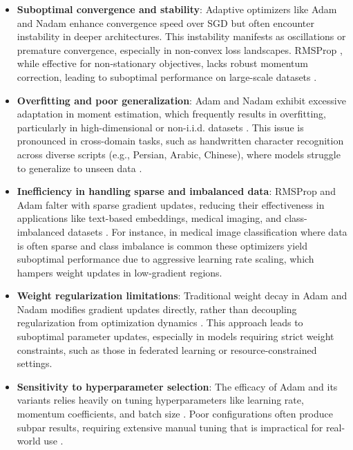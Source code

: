 \documentclass{article}
\begin{document}
\begin{itemize}
\item \textbf{Suboptimal convergence and stability}: Adaptive optimizers like Adam \cite{kingma2014adam} and Nadam \cite{Dozat2016} enhance convergence speed over SGD but often encounter instability in deeper architectures. This instability manifests as oscillations or premature convergence, especially in non-convex loss landscapes. RMSProp \cite{Tieleman2012}, while effective for non-stationary objectives, lacks robust momentum correction, leading to suboptimal performance on large-scale datasets \cite{Wilson2017}.

\item \textbf{Overfitting and poor generalization}: Adam and Nadam exhibit excessive adaptation in moment estimation, which frequently results in overfitting, particularly in high-dimensional or non-i.i.d. datasets \cite{Wilson2017}. This issue is pronounced in cross-domain tasks, such as handwritten character recognition across diverse scripts (e.g., Persian, Arabic, Chinese), where models struggle to generalize to unseen data \cite{Zhang2017}.

\item \textbf{Inefficiency in handling sparse and imbalanced data}: RMSProp and Adam falter with sparse gradient updates, reducing their effectiveness in applications like text-based embeddings, medical imaging, and class-imbalanced datasets \cite{Duchi2011}. For instance, in medical image classification where data is often sparse and class imbalance is common these optimizers yield suboptimal performance due to aggressive learning rate scaling, which hampers weight updates in low-gradient regions.

\item \textbf{Weight regularization limitations}: Traditional weight decay in Adam and Nadam modifies gradient updates directly, rather than decoupling regularization from optimization dynamics \cite{Loshchilov2017}. This approach leads to suboptimal parameter updates, especially in models requiring strict weight constraints, such as those in federated learning or resource-constrained settings.

\item \textbf{Sensitivity to hyperparameter selection}: The efficacy of Adam and its variants relies heavily on tuning hyperparameters like learning rate, momentum coefficients, and batch size \cite{Sivaprasad2019}. Poor configurations often produce subpar results, requiring extensive manual tuning that is impractical for real-world use \cite{Sivaprasad2019}.
\end{itemize}
\end{document}
